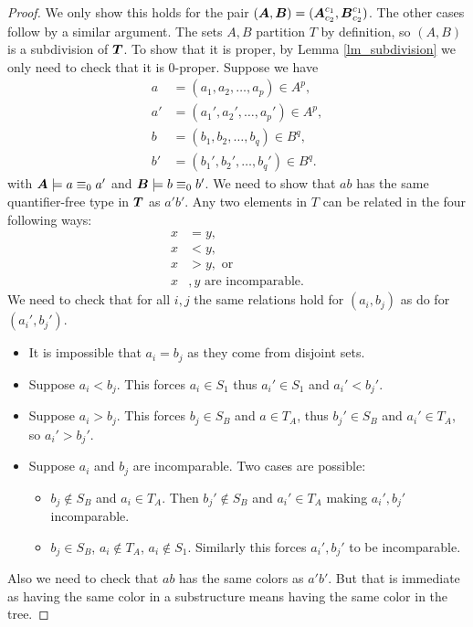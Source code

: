 \documentclass{amsart}
\DeclareMathOperator{\TT}{\boldface T}
\DeclareMathOperator{\A}{\boldface A}
\DeclareMathOperator{\B}{\boldface B}
\begin{document}
\begin{proof}
  We only show this holds for the pair $(\A, \B) = (\A^{c_1}_{c_2} ,\B^{c_1}_{c_2})$.
  The other cases follow by a similar argument.
  The sets $A,B$ partition $T$ by definition, so $(A,B)$ is a subdivision of $\TT$.
  To show that it is proper, by Lemma \ref{lm_subdivision} we only need to check that it is $0$-proper. Suppose we have
  \begin{align*}
    a &= (a_1, a_2, \ldots, a_p) \in A^p, \\
    a' &= (a_1', a_2', \ldots, a_p') \in A^p,  \\
    b &= (b_1, b_2, \ldots, b_q) \in B^q,  \\
    b' &= (b_1', b_2', \ldots, b_q') \in B^q. 
  \end{align*}
  with $\A \models a \equiv_0 a'$ and $\B \models b \equiv_0 b'$.
  We need to show that $ab$ has the same quantifier-free type in $\TT$ as $a'b'$.
  Any two elements in $T$ can be related in the four following ways:
  \begin{align*}
    x &= y, \\
    x &< y, \\
    x &> y, \text{ or } \\
    x&,y \text{ are incomparable.}
  \end{align*}
  We need to check that  for all $i,j$ the same relations hold for $(a_i, b_j)$ as do for $(a_i', b_j')$.
  
  \begin{itemize}
  \item It is impossible that $a_i = b_j$ as they come from disjoint sets.
  \item Suppose $a_i < b_j$. This forces $a_i \in S_1$ thus $a_i' \in S_1$ and $a_i' < b_j'$.
  \item Suppose $a_i > b_j$. This forces $b_j \in S_B$ and $a \in T_A$, thus $b_j' \in S_B$ and $a_i' \in T_A$, so $a_i' > b_j'$.
  \item Suppose $a_i$ and $b_j$ are incomparable. Two cases are possible:
    \begin{itemize}
    \item $b_j \notin S_B$ and $a_i \in T_A$. Then $b_j' \notin S_B$ and $a_i' \in T_A$ making $a_i', b_j'$ incomparable.
    \item $b_j \in S_B$, $a_i \notin T_A$, $a_i \notin S_1$. Similarly this forces $a_i', b_j'$ to be incomparable.
    \end{itemize}
  \end{itemize}
  Also we need to check that $ab$ has the same colors as $a'b'$. But that is immediate as having the same color in a substructure means having the same color in the tree.
\end{proof}
\end{document}
